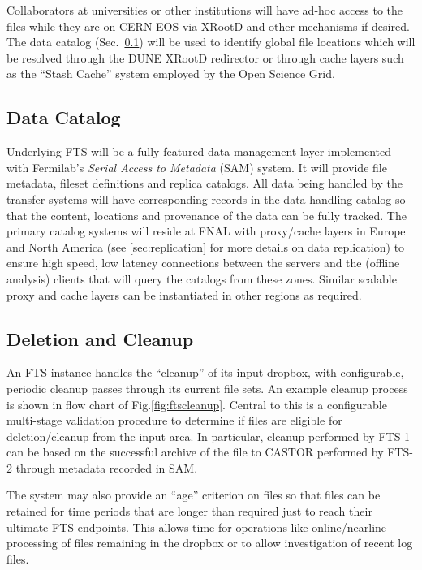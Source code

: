 \documentclass[pdftex,12pt,letter]{article}
\begin{document}

\noindent Collaborators at universities or other institutions will have ad-hoc
access to the files while they are on CERN EOS via XRootD and other mechanisms if desired. 
The data catalog (Sec.~\ref{sec:sam}) will be used to identify global file
locations which will be resolved through the DUNE XRootD redirector or
through cache layers such as the ``Stash Cache'' system employed by
the Open Science Grid.

\subsection{Data Catalog}
\label{sec:sam}

Underlying FTS will be a fully featured data management layer
implemented with Fermilab's \textit{Serial Access to Metadata} (SAM) system.
It will provide file metadata, fileset definitions and replica
catalogs.  All data being handled by the transfer systems will have
corresponding records in the data handling catalog so that the
content, locations and provenance of the data can be fully tracked.
The primary catalog systems will reside at FNAL with proxy/cache
layers in Europe and North America (see \ref{sec:replication}
for more details on data replication) to ensure high speed,
low latency connections between the servers and the (offline analysis)
clients that will query the catalogs from these zones.  Similar
scalable proxy and cache layers can be instantiated in other regions as required.

\subsection{Deletion and Cleanup}
\label{sec:cleanup}

An FTS instance handles the ``cleanup'' of its input dropbox, with
configurable, periodic cleanup passes through its current file sets.
An example cleanup process is shown in flow chart of
Fig.\ref{fig:ftscleanup}.  Central to this is a configurable
multi-stage validation procedure to determine if files are eligible
for deletion/cleanup from the input area.  In particular, cleanup
performed by FTS-1 can be based on the successful archive of the file
to CASTOR performed by FTS-2 through metadata recorded in SAM.

The system may also provide an ``age'' criterion on files so that
files can be retained for time periods that are longer than required
just to reach their ultimate FTS endpoints.  This allows time for
operations like online/nearline processing of files remaining in the
dropbox or to allow investigation of recent log files.
\end{document}
